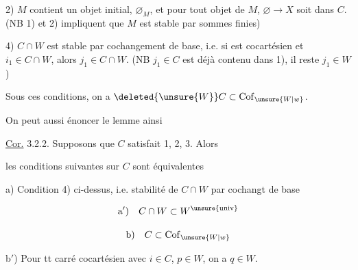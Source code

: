 2) $M$ contient un objet initial, $\varnothing_M$, et pour tout objet  de $M$, $\varnothing\longrightarrow X$ soit dans $C$. (NB 1) et 2) impliquent que $M$ est stable par sommes finies)


4) $C\cap W$ est stable par cochangement de base, i.e. si
est cocartésien et  $i_1\in C\cap W$, alors $j_1\in C\cap W$. (NB $j_1\in C$ est déjà contenu dans 1), il reste  $j_1\in W$)

Sous ces conditions, on a $\deleted{\unsure{W}}C\subset\mathrm{Cof}_{\unsure{W|w}}$.

On peut aussi énoncer le lemme ainsi

\uline{Cor.} 3.2.2. Supposons que $C$ satisfait 1, 2, 3. Alors 


les conditions suivantes sur $C$ sont équivalentes

a) Condition 4) ci-dessus, i.e. stabilité de $C\cap W$ par cochangt de base

\[
\text{a$'$)}\quad C\cap W\subset W^{\unsure{\mathrm{univ}}}
\]

\[
\text{b)}\quad C\subset\mathrm{Cof}_{\unsure{W|w}}
\]

b$'$) Pour tt carré cocartésien
avec $i\in C$, $p\in W$, on a $q\in W$.

